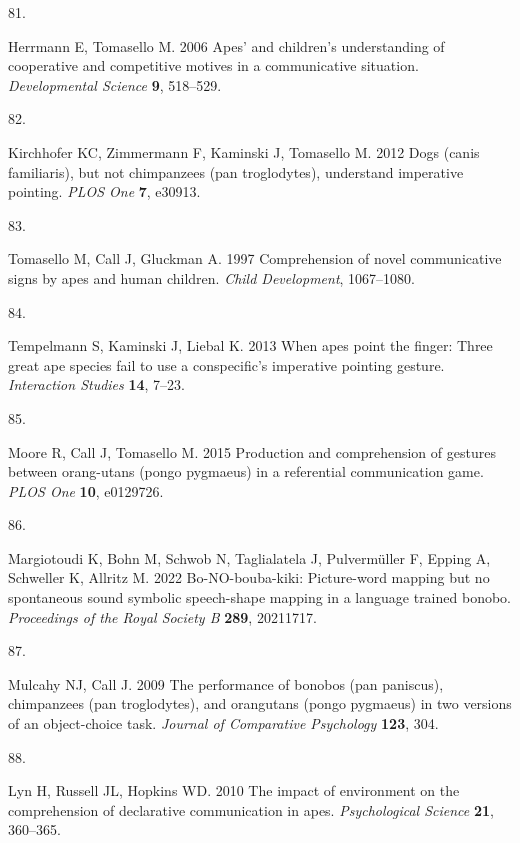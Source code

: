 \documentclass[
  man,floatsintext]{apa6}
\newlength{\cslhangindent}
\newlength{\csllabelwidth}
\newlength{\cslentryspacingunit} %
\newenvironment{CSLReferences}[2] %
 {%
  \setlength{\parindent}{0pt}
  \ifodd #1
  \let\oldpar\par
  \def\par{\hangindent=\cslhangindent\oldpar}
  \fi
  \setlength{\parskip}{#2\cslentryspacingunit}
 }%
 {}
\newcommand{\CSLLeftMargin}[1]{\parbox[t]{\csllabelwidth}{#1}}
\newcommand{\CSLRightInline}[1]{\parbox[t]{\linewidth - \csllabelwidth}{#1}\break}
\begin{document}
\begin{CSLReferences}{0}{0}
\leavevmode{}%
\CSLLeftMargin{81. }
\CSLRightInline{Herrmann E, Tomasello M. 2006 Apes' and children's understanding of cooperative and competitive motives in a communicative situation. \emph{Developmental Science} \textbf{9}, 518--529.}

\leavevmode{}%
\CSLLeftMargin{82. }
\CSLRightInline{Kirchhofer KC, Zimmermann F, Kaminski J, Tomasello M. 2012 Dogs (canis familiaris), but not chimpanzees (pan troglodytes), understand imperative pointing. \emph{PLOS One} \textbf{7}, e30913.}

\leavevmode{}%
\CSLLeftMargin{83. }
\CSLRightInline{Tomasello M, Call J, Gluckman A. 1997 Comprehension of novel communicative signs by apes and human children. \emph{Child Development}, 1067--1080.}

\leavevmode{}%
\CSLLeftMargin{84. }
\CSLRightInline{Tempelmann S, Kaminski J, Liebal K. 2013 When apes point the finger: Three great ape species fail to use a conspecific's imperative pointing gesture. \emph{Interaction Studies} \textbf{14}, 7--23.}

\leavevmode{}%
\CSLLeftMargin{85. }
\CSLRightInline{Moore R, Call J, Tomasello M. 2015 Production and comprehension of gestures between orang-utans (pongo pygmaeus) in a referential communication game. \emph{PLOS One} \textbf{10}, e0129726.}

\leavevmode{}%
\CSLLeftMargin{86. }
\CSLRightInline{Margiotoudi K, Bohn M, Schwob N, Taglialatela J, Pulvermüller F, Epping A, Schweller K, Allritz M. 2022 Bo-NO-bouba-kiki: Picture-word mapping but no spontaneous sound symbolic speech-shape mapping in a language trained bonobo. \emph{Proceedings of the Royal Society B} \textbf{289}, 20211717.}

\leavevmode{}%
\CSLLeftMargin{87. }
\CSLRightInline{Mulcahy NJ, Call J. 2009 The performance of bonobos (pan paniscus), chimpanzees (pan troglodytes), and orangutans (pongo pygmaeus) in two versions of an object-choice task. \emph{Journal of Comparative Psychology} \textbf{123}, 304.}

\leavevmode{}%
\CSLLeftMargin{88. }
\CSLRightInline{Lyn H, Russell JL, Hopkins WD. 2010 The impact of environment on the comprehension of declarative communication in apes. \emph{Psychological Science} \textbf{21}, 360--365.}


\end{CSLReferences}
\end{document}
